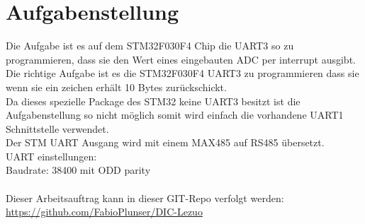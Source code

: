 \newpage
\section{Aufgabenstellung}
    Die Aufgabe ist es auf dem STM32F030F4 Chip die UART3 so zu programmieren, dass sie den Wert eines eingebauten ADC per interrupt ausgibt.\\
    Die richtige Aufgabe ist es die STM32F030F4 UART3 zu programmieren dass sie wenn sie ein zeichen erhält 10 Bytes zurückschickt. \\
    Da dieses spezielle Package des STM32 keine UART3 besitzt ist die Aufgabenstellung so nicht möglich somit wird einfach die vorhandene UART1 Schnittstelle verwendet.\\
    Der STM UART Ausgang wird mit einem MAX485 auf RS485 übersetzt.\\
    UART einstellungen:\\
    Baudrate: 38400 mit ODD parity\\\\
    
    \noindent Dieser Arbeitsauftrag kann in dieser GIT-Repo verfolgt werden: \url{https://github.com/FabioPlunser/DIC-Lezuo}
    

